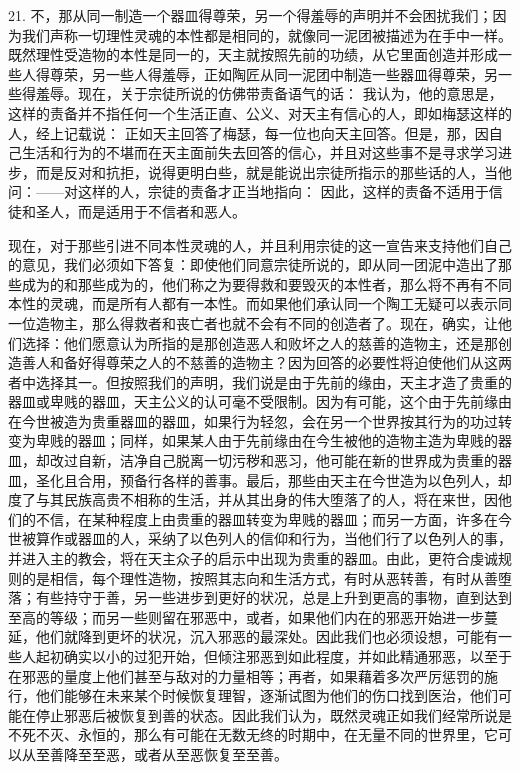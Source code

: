 21. 不，那从同一制造一个器皿得尊荣，另一个得羞辱的声明并不会困扰我们；因为我们声称一切理性灵魂的本性都是相同的，就像同一泥团被描述为在手中一样。既然理性受造物的本性是同一的，天主就按照先前的功绩，从它里面创造并形成一些人得尊荣，另一些人得羞辱，正如陶匠从同一泥团中制造一些器皿得尊荣，另一些得羞辱。现在，关于宗徒所说的仿佛带责备语气的话： 我认为，他的意思是，这样的责备并不指任何一个生活正直、公义、对天主有信心的人，即如梅瑟这样的人，经上记载说： 正如天主回答了梅瑟，每一位也向天主回答。但是，那，因自己生活和行为的不堪而在天主面前失去回答的信心，并且对这些事不是寻求学习进步，而是反对和抗拒，说得更明白些，就是能说出宗徒所指示的那些话的人，当他问：——对这样的人，宗徒的责备才正当地指向： 因此，这样的责备不适用于信徒和圣人，而是适用于不信者和恶人。\par

现在，对于那些引进不同本性灵魂的人，并且利用宗徒的这一宣告来支持他们自己的意见，我们必须如下答复：即使他们同意宗徒所说的，即从同一团泥中造出了那些成为的和那些成为的，他们称之为要得救和要毁灭的本性者，那么将不再有不同本性的灵魂，而是所有人都有一本性。而如果他们承认同一个陶工无疑可以表示同一位造物主，那么得救者和丧亡者也就不会有不同的创造者了。现在，确实，让他们选择：他们愿意认为所指的是那创造恶人和败坏之人的慈善的造物主，还是那创造善人和备好得尊荣之人的不慈善的造物主？因为回答的必要性将迫使他们从这两者中选择其一。但按照我们的声明，我们说是由于先前的缘由，天主才造了贵重的器皿或卑贱的器皿，天主公义的认可毫不受限制。因为有可能，这个由于先前缘由在今世被造为贵重器皿的器皿，如果行为轻忽，会在另一个世界按其行为的功过转变为卑贱的器皿；同样，如果某人由于先前缘由在今生被他的造物主造为卑贱的器皿，却改过自新，洁净自己脱离一切污秽和恶习，他可能在新的世界成为贵重的器皿，圣化且合用，预备行各样的善事。最后，那些由天主在今世造为以色列人，却度了与其民族高贵不相称的生活，并从其出身的伟大堕落了的人，将在来世，因他们的不信，在某种程度上由贵重的器皿转变为卑贱的器皿；而另一方面，许多在今世被算作或器皿的人，采纳了以色列人的信仰和行为，当他们行了以色列人的事，并进入主的教会，将在天主众子的启示中出现为贵重的器皿。由此，更符合虔诚规则的是相信，每个理性造物，按照其志向和生活方式，有时从恶转善，有时从善堕落；有些持守于善，另一些进步到更好的状况，总是上升到更高的事物，直到达到至高的等级；而另一些则留在邪恶中，或者，如果他们内在的邪恶开始进一步蔓延，他们就降到更坏的状况，沉入邪恶的最深处。因此我们也必须设想，可能有一些人起初确实以小的过犯开始，但倾注邪恶到如此程度，并如此精通邪恶，以至于在邪恶的量度上他们甚至与敌对的力量相等；再者，如果藉着多次严厉惩罚的施行，他们能够在未来某个时候恢复理智，逐渐试图为他们的伤口找到医治，他们可能在停止邪恶后被恢复到善的状态。因此我们认为，既然灵魂正如我们经常所说是不死不灭、永恒的，那么有可能在无数无终的时期中，在无量不同的世界里，它可以从至善降至至恶，或者从至恶恢复至至善。\par

